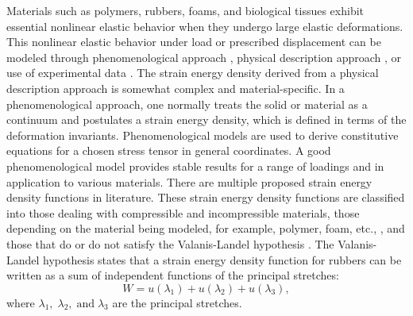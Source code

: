\documentclass[11pt,letter,subeqn,fleqn]{article}
\numberwithin{equation}{section}
\numberwithin{table}{section}
\numberwithin{figure}{section}
\begin{document}
 Materials such as polymers, rubbers, foams, and biological tissues exhibit essential nonlinear elastic behavior when they undergo large elastic deformations. This nonlinear elastic behavior under load or prescribed displacement can be modeled through phenomenological approach \cite{marckmann2006comparison}, physical description approach \cite{treloar1975physics}, or use of experimental data \cite{ogden2004fitting}. The strain energy density derived from a physical description approach is somewhat complex and material-specific. In a phenomenological approach, one normally treats the solid or material as a continuum and postulates a strain energy density, which is defined in terms of the deformation invariants. Phenomenological models are used to derive constitutive equations for a chosen stress tensor in general coordinates. A good phenomenological model provides stable results for a range of loadings and in application to various materials.
 There are multiple proposed strain energy density functions in literature. These strain energy density functions are classified into those dealing with compressible and incompressible materials, those depending on the material being modeled, for example, polymer, foam, etc., \cite{attard2004hyperelastic}, and those that do or do not satisfy the Valanis-Landel hypothesis \cite{valanis1967strain}. The Valanis-Landel hypothesis states that a strain energy density function for rubbers can be written as a sum of independent functions of the principal stretches:
 \begin{equation}\label{eq:c2}
 W=u(\lambda_1)+u(\lambda_2)+u(\lambda_3),
 \end{equation}
 \noindent where $\lambda_1, \;\lambda_2,\;\text{and}\; \lambda_3$ are the principal stretches.
\end{document}
